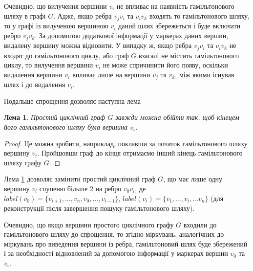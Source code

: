 \documentclass[a4paper,14pt,ukrainian]{extarticle}
\newtheorem{lemma}{Лема}
\begin{document}
    Очевидно, що вилучення вершини $v_i$ не впливає на наявність гамільтонового шляху в графі $G$.
    Адже, якщо ребра $v_j$$v_i$ та $v_i$$v_k$ входять то гамільтонового шляху, то у графі із вилученою вершиною $v_i$ даний шлях збережеться і буде включати ребро $v_j$$v_k$.
    За допомогою додаткової інформації у маркерах даних вершин, видалену вершину можна відновити.
    У випадку ж, якщо ребра $v_j$$v_i$ та $v_i$$v_k$ не входят до гамільтонового циклу, або граф $G$ взагалі не містить гамільтонового циклу, то вилучення вершини $v_i$ не може спричинити його появу, оскільки видалення вершини $v_i$ впливає лише на вершини $v_j$ та $v_k$, між якими існував шлях і до видалення $v_i$.

    Подальше спрощення дозволяє наступна лема
    \begin{lemma}
        \label{lemmaHamiltonianTraversal}
        Простий циклічний граф $G$ завжди можна обійти так, щоб кінецем його гамільтонового шляху була вершина $v_i$.
    \end{lemma}
    \begin{proof}
        Це можна зробити, наприклад, поклавши за початок гамільтонового шляху вершину $v_i$.
        Пройшовши граф до кінця отримаємо інший кінець гамільтонового шляху графу $G$.
    \end{proof}
    Лема \ref{lemmaHamiltonianTraversal} дозволяє замінити простий циклічний граф $G$, що має лише одну вершину $v_i$ спупеню більше 2 на ребро $v_0$$v_i$, де $label(v_0)=\{ v_{i+1}, \dots , v_n, v_0, \dots , v_{i-1} \}$, $label(v_i)=\{ v_1, \dots, v_i, \dots v_n \}$ (для реконструкції після завершення пошуку гамільтонового шляху).
    \begin{figure}[h]
        \centering
    \end{figure}
    Очевидно, що якщо вершини простого циклічного графу $G$ входили до гамільтонового шляху до спрощення, то згідно міркувань, аналогічних до міркувань про виведення вершини із ребра, гамільтоновий шлях буде збережений і за необхідності відновлений за допомогою інформації у маркерах вершин $v_0$ та $v_i$.
\end{document}
